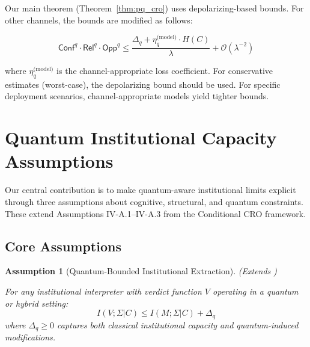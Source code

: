 \documentclass{ieeeaccess}
\newcommand{\Conf}{\mathsf{Conf}}
\newcommand{\Rel}{\mathsf{Rel}}
\newcommand{\Opp}{\mathsf{Opp}}
\newtheorem{assumption}{Assumption}[section]
\begin{document}
Our main theorem (Theorem~\ref{thm:pq_cro}) uses depolarizing-based bounds. For other channels, the bounds are modified as follows:

\begin{equation}
    \Conf^q \cdot \Rel^q \cdot \Opp^q \leq \frac{\Delta_q + \eta_q^{\text{(model)}} \cdot H(C)}{\lambda} + \mathcal{O}(\lambda^{-2})
\end{equation}

where $\eta_q^{\text{(model)}}$ is the channel-appropriate loss coefficient. For conservative estimates (worst-case), the depolarizing bound should be used. For specific deployment scenarios, channel-appropriate models yield tighter bounds.


\section{Quantum Institutional Capacity Assumptions}\label{sec:assumptions}

Our central contribution is to make quantum-aware institutional limits explicit through three assumptions about cognitive, structural, and quantum constraints. These extend Assumptions IV-A.1--IV-A.3 from the Conditional CRO framework.

\subsection{Core Assumptions}

\begin{assumption}[Quantum-Bounded Institutional Extraction]
\label{ass:qextraction}
\textit{(Extends \cite[Assumption IV-A.1]{Minka2026CRO})}

For any institutional interpreter with verdict function $V$ operating in a quantum or hybrid setting:
\begin{equation}
    I(V; \Sigma|C) \leq I(M; \Sigma|C) + \Delta_q
\end{equation}
where $\Delta_q \geq 0$ captures both classical institutional capacity and quantum-induced modifications.
\end{assumption}
\end{document}
